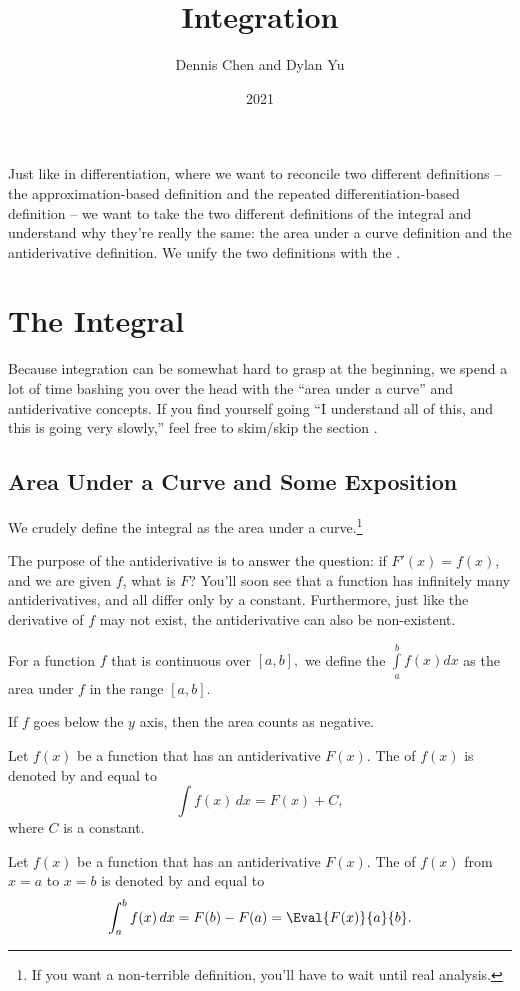 \documentclass{article}
\title{Integration}
\author{Dennis Chen and Dylan Yu}
\date{2021}
\begin{document}
\maketitle

Just like in differentiation, where we want to reconcile two different definitions -- the approximation-based definition and the repeated differentiation-based definition -- we want to take the two different definitions of the integral and understand why they're really the same: the area under a curve definition and the antiderivative definition. We unify the two definitions with the .

\section{The Integral}

Because integration can be somewhat hard to grasp at the beginning, we spend a lot of time bashing you over the head with the ``area under a curve'' and antiderivative concepts. If you find yourself going ``I understand all of this, and this is going very slowly,'' feel free to skim/skip the section .

\subsection{Area Under a Curve and Some Exposition}

We crudely define the integral as the area under a curve.\footnote{If you want a non-terrible definition, you'll have to wait until real analysis.}

The purpose of the antiderivative is to answer the question: if $F'(x)=f(x)$, and we are given $f$, what is $F$? You'll soon see that a function has infinitely many antiderivatives, and all differ only by a constant. Furthermore, just like the derivative of $f$ may not exist, the antiderivative can also be non-existent.

\begin{defi}[Integral]
For a function $f$ that is continuous over $[a,b],$ we define the  $\int\limits_{a}^{b}f(x)dx$ as the area under $f$ in the range $[a,b].$

If $f$ goes below the $y$ axis, then the area counts as negative.
\end{defi}

\begin{defi}
Let $f(x)$ be a function that has an antiderivative $F(x)$. The  of $f(x)$ is denoted by and equal to
$$\int f(x)\,dx = F(x)+C,$$
where $C$ is a constant.
\end{defi}
\begin{defi}
Let $f(x)$ be a function that has an antiderivative $F(x)$. The  of $f(x)$ from $x=a$ to $x=b$ is denoted by and equal to
$$\int_a^b f(x)\, dx=F(b)-F(a)=\Eval{F(x)}{a}{b}.$$
\end{defi}
\end{document}
